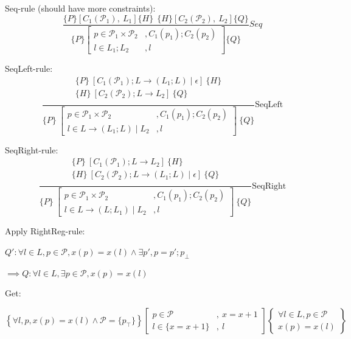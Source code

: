 \documentclass[12pt]{article}
\begin{document}
Seq-rule (should have more constraints):
\[
\quad 
\frac{
\{P\}\left[C_1(\mathcal{P}_1),~L_1\right]\{H\} ~~
\{H\}\left[C_2(\mathcal{P}_2),~L_2\right]\{Q\}
}
{
\{P\}\left[
\begin{array}{ll}
     p \in \mathcal{P}_1 \times \mathcal{P}_2 &, C_1(p_1);C_2(p_2) \\
     l \in L_1;L_2&, l 
\end{array}\right]\{Q\}
}
{Seq}
\]

SeqLeft-rule:
\[
\quad
\frac{
\begin{array}{c}
\{ P \} \ [C_1(\mathcal{P}_1) ; L\rightarrow (L_1;L)\mid \epsilon] \ \{ H\} \\
\{ H \} \ [C_2(\mathcal{P}_2) ; L\rightarrow L_2] \ \{ Q\} \\
\end{array}
}{
\{ P \} \ \left[ 
\begin{array}{ll}
     p \in \mathcal{P}_1 \times \mathcal{P}_2 &, C_1(p_1);C_2(p_2) \\
     l \in L\rightarrow (L_1;L)\mid L_2 &, l
\end{array}\right] \ 
\{ Q\}
}
{\text{SeqLeft}}
\]

SeqRight-rule:
\[
\quad
\frac{
\begin{array}{c}
\{ P \} \ [C_1(\mathcal{P}_1) ; L\rightarrow L_2] \ \{ H\} \\
\{ H \} \ [C_2(\mathcal{P}_2) ; L\rightarrow (L_1;L)\mid \epsilon] \ \{ Q\} \\
\end{array}
}{
\{ P \} \ \left[ 
\begin{array}{ll}
     p \in \mathcal{P}_1 \times \mathcal{P}_2 &, C_1(p_1);C_2(p_2) \\
     l \in L\rightarrow (L;L_1)\mid L_2 &, l
\end{array}\right] \ 
\{ Q\}
}
{\text{SeqRight}}
\]


Apply RightReg-rule:


$Q': \forall l \in L , p \in \mathcal{P}, x(p) = x(l) \wedge \exists p', p =p';p_\bot$

$\implies Q: \forall l \in L , \exists p \in \mathcal{P}, x(p) = x(l)$ 

Get:

\[
\left\{ \forall l, p, x(p) = x(l) \wedge \mathcal{P} =\{p_\top\} \right\}
\left[
\begin{array}{ll}
p \in \mathcal{P} & , ~x=x+1 \\
l \in \{x=x+1\} & , ~l
\end{array}
\right]
\left\{
\begin{array}{c}
\forall l \in L , p \in \mathcal{P} \\
x(p) = x(l)
\end{array}
\right\}
\]
\end{document}
